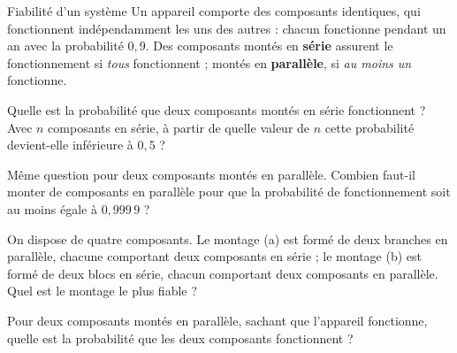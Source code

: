 \begin{exercice}[3]{Fiabilité d'un système}
Un appareil comporte des composants identiques, qui fonctionnent indépendamment les uns des autres : chacun fonctionne pendant
un an avec la probabilité $0{,}9$. Des composants montés en \textbf{série} assurent le fonctionnement si \emph{tous} fonctionnent ;
montés en \textbf{parallèle}, si \emph{au moins un} fonctionne.
\begin{questions}
  \item Quelle est la probabilité que deux composants montés en série fonctionnent ? Avec $n$ composants en série, à partir de
    quelle valeur de $n$ cette probabilité devient-elle inférieure à $0{,}5$ ?
  \item Même question pour deux composants montés en parallèle. Combien faut-il monter de composants en parallèle pour que la
    probabilité de fonctionnement soit au moins égale à $0{,}999\,9$ ?
  \item On dispose de quatre composants. Le montage (a) est formé de deux branches en parallèle, chacune comportant deux composants
    en série ; le montage (b) est formé de deux blocs en série, chacun comportant deux composants en parallèle. Quel est le
    montage le plus fiable ?
  \item Pour deux composants montés en parallèle, sachant que l'appareil fonctionne, quelle est la probabilité que les deux
    composants fonctionnent ?
\end{questions}
\begin{center}
\end{center}
\end{exercice}
